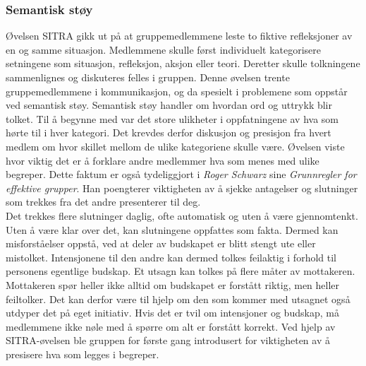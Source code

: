 \subsubsection{Semantisk støy}

Øvelsen SITRA gikk ut på at gruppemedlemmene leste to fiktive refleksjoner av en og samme situasjon.
Medlemmene skulle først individuelt kategorisere setningene som situasjon, refleksjon, aksjon eller teori.
Deretter skulle tolkningene sammenlignes og diskuteres felles i gruppen.
Denne øvelsen trente gruppemedlemmene i kommunikasjon, og da spesielt i problemene som oppstår ved semantisk støy.
Semantisk støy handler om hvordan ord og uttrykk blir tolket.
Til å begynne med var det store ulikheter i oppfatningene av hva som hørte til i hver kategori.
Det krevdes derfor diskusjon og presisjon fra hvert medlem om hvor skillet mellom de ulike kategoriene skulle være.
Øvelsen viste hvor viktig det er å forklare andre medlemmer hva som menes med ulike begreper. 
Dette faktum er også tydeliggjort i \textit{Roger Schwarz} sine \textit{Grunnregler for effektive grupper}\cite{schwarz}. 
Han poengterer viktigheten av å sjekke antagelser og slutninger som trekkes fra det andre presenterer til deg. \\

Det trekkes flere slutninger daglig, ofte automatisk og uten å være gjennomtenkt. 
Uten å være klar over det, kan slutningene oppfattes som fakta.
Dermed kan misforståelser oppstå, ved at deler av budskapet er blitt stengt ute eller mistolket.
Intensjonene til den andre kan dermed tolkes feilaktig i forhold til personens egentlige budskap.
Et utsagn kan tolkes på flere måter av mottakeren.
Mottakeren spør heller ikke alltid om budskapet er forstått riktig, men heller feiltolker.
Det kan derfor være til hjelp om den som kommer med utsagnet også utdyper det på eget initiativ.
Hvis det er tvil om intensjoner og budskap, må medlemmene ikke nøle med å spørre om alt er forstått korrekt.
Ved hjelp av SITRA-øvelsen ble gruppen for første gang introdusert for viktigheten av å presisere hva som legges i begreper. \\

